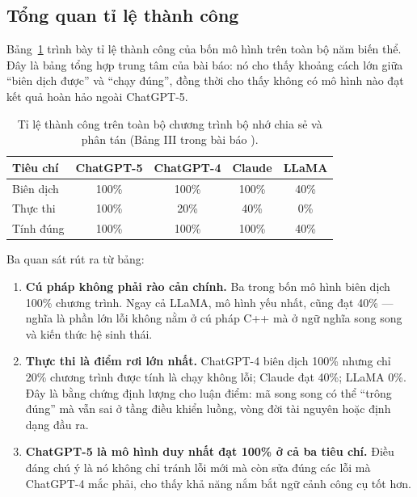 \label{sec:ketqua}

\subsection{Tổng quan tỉ lệ thành công}

Bảng~\ref{tab:success} trình bày tỉ lệ thành công của bốn mô hình trên toàn bộ
năm biến thể. Đây là bảng tổng hợp trung tâm của bài báo: nó cho thấy khoảng cách
lớn giữa “biên dịch được” và “chạy đúng”, đồng thời cho thấy không có mô hình nào
đạt kết quả hoàn hảo ngoài ChatGPT-5.

\begin{table}[H]
\centering
\small
\caption{Tỉ lệ thành công trên toàn bộ chương trình bộ nhớ chia sẻ và phân tán
(Bảng III trong bài báo \cite{diehl2026}).}
\label{tab:success}
\begin{tabular}{@{}lcccc@{}}
\toprule
\textbf{Tiêu chí} & \textbf{ChatGPT-5} & \textbf{ChatGPT-4} & \textbf{Claude} & \textbf{LLaMA} \\
\midrule
Biên dịch   & 100\% & 100\% & 100\% & 40\% \\
Thực thi    & 100\% & 20\%  & 40\%  & 0\% \\
Tính đúng   & 100\% & 100\% & 100\% & 40\% \\
\bottomrule
\end{tabular}
\end{table}

Ba quan sát rút ra từ bảng:

\begin{enumerate}
  \item \textbf{Cú pháp không phải rào cản chính.} Ba trong bốn mô hình biên dịch
        100\% chương trình. Ngay cả LLaMA, mô hình yếu nhất, cũng đạt 40\% — nghĩa
        là phần lớn lỗi không nằm ở cú pháp C++ mà ở ngữ nghĩa song song và kiến
        thức hệ sinh thái.
  \item \textbf{Thực thi là điểm rơi lớn nhất.} ChatGPT-4 biên dịch 100\% nhưng chỉ
        20\% chương trình được tính là chạy không lỗi; Claude đạt 40\%; LLaMA 0\%.
        Đây là bằng chứng định lượng cho luận điểm: mã song song có thể “trông
        đúng” mà vẫn sai ở tầng điều khiển luồng, vòng đời tài nguyên hoặc định
        dạng đầu ra.
  \item \textbf{ChatGPT-5 là mô hình duy nhất đạt 100\% ở cả ba tiêu chí.} Điều
        đáng chú ý là nó không chỉ tránh lỗi mới mà còn sửa đúng các lỗi mà
        ChatGPT-4 mắc phải, cho thấy khả năng nắm bắt ngữ cảnh công cụ tốt hơn.
\end{enumerate}

